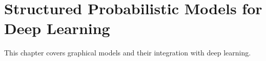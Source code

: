 
\chapter{Structured Probabilistic Models for Deep Learning}
\label{chap:structured-probabilistic-models}

This chapter covers graphical models and their integration with deep learning.





